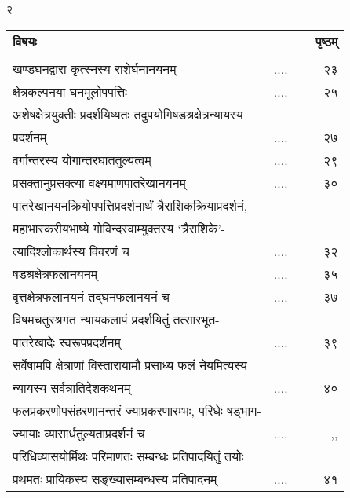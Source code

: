 \documentclass[11pt, openany]{book}
\begin{document}
\newpage

\begin{center}
	२
\end{center}
\vspace{3mm}
\thispagestyle{empty}
\begin{tabular}{lp{1cm}p{.2cm}r}
\hspace{1cm} \textbf{विषयः} &&& \textbf{पृष्ठम्} \\
&&&\\
खण्डघनद्वारा कृत्स्नस्य राशेर्घनानयनम्  & ....&&  ~ २३\\
क्षेत्रकल्पनया घनमूलोपपत्तिः & ....&&  ~ २५\\
अशेषक्षेत्रयुक्तीः प्रदर्शयिष्यतः तदुपयोगिषडश्रक्षेत्रन्यायस्य \\प्रदर्शनम् & ....&& ~ २७\\
वर्गान्तरस्य योगान्तरघाततुल्यत्वम् & ....&&  ~ २९\\
प्रसक्तानुप्रसक्त्या वक्ष्यमाणपातरेखानयनम्  & ....&&  ~ ३०\\
पातरेखानयनक्रियोपपत्तिप्रदर्शनार्थं त्रैराशिकक्रियाप्रदर्शनं,\\
महाभास्करीयभाष्ये गोविन्दस्वाम्युक्तस्य `त्रैराशिके'-  \\
त्यादिश्लोकार्थस्य विवरणं च & ....&& ~ ३२\\
षडश्रक्षेत्रफलानयनम् & ....&&  ~ ३५\\
वृत्तक्षेत्रफलानयनं तद्घनफलानयनं च  & ....&&  ~ ३७\\
विषमचतुरश्रगत न्यायकलापं प्रदर्शयितुं तत्सारभूत-\\पातरेखादेः
स्वरूपप्रदर्शनम् & ....&&  ~ ३९\\
सर्वेषामपि क्षेत्राणां विस्तारायामौ प्रसाध्य फलं नेयमित्यस्य  \\
 न्यायस्य सर्वत्रातिदेशकथनम् & ....&&  ~ ४०\\
फलप्रकरणोपसंहरणानन्तरं ज्याप्रकरणारम्भः, परिधेः षड्भाग-  \\
ज्यायाः व्यासार्धतुल्यताप्रदर्शनं च & ....&&  ,, \\
परिधिव्यासयोर्मिथः परिमाणतः सम्बन्धः प्रतिपादयितुं तयोः \\
प्रथमतः प्रायिकस्य सङ्ख्यासम्बन्धस्य प्रतिपादनम्  & ....&&  ~ ४१\\

\end{tabular}
\end{document}
